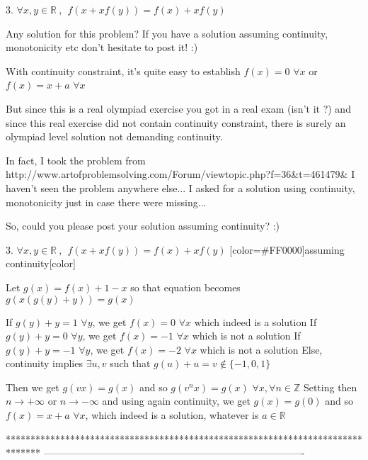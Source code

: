 \begin{solution}
	\begin{tcolorbox}3. $\forall x, y \in \mathbb{R} \ , \  \  f(x+xf(y))=f(x)+xf(y)$\end{tcolorbox}
\begin{tcolorbox}Any solution for this problem? If you have a solution assuming continuity, monotonicity etc don't hesitate to post it! :) \end{tcolorbox}
With continuity constraint, it's quite easy to establish $f(x)=0$ $\forall x$ or $f(x)=x+a$ $\forall x$

But since this is a real olympiad exercise you got in a real exam (isn't it ?) and since this real exercise did not contain continuity constraint, there is surely an olympiad level solution not demanding continuity.
\end{solution}



\begin{solution}
	In fact, I took the problem from http://www.artofproblemsolving.com/Forum/viewtopic.php?f=36&t=461479& 
I haven't seen the problem anywhere else... I asked for a solution using continuity, monotonicity just in case there were missing...

So, could you please post your solution assuming continuity? :)
\end{solution}



\begin{solution}
	\begin{tcolorbox}3. $\forall x, y \in \mathbb{R} \ , \  \  f(x+xf(y))=f(x)+xf(y)$
[color=#FF0000]assuming continuity[\/color]

\end{tcolorbox}
Let $g(x)=f(x)+1-x$ so that equation becomes $g(x(g(y)+y))=g(x)$

If $g(y)+y=1$ $\forall y$, we get $\boxed{f(x)=0}$ $\forall x$ which indeed is a solution
If $g(y)+y=0$ $\forall y$, we get $f(x)=-1$ $\forall x$ which is not a solution
If $g(y)+y=-1$ $\forall y$, we get $f(x)=-2$ $\forall x$ which is not a solution
Else, continuity implies $\exists u,v$ such that $g(u)+u=v\notin\{-1,0,1\}$

Then we get $g(vx)=g(x)$ and so $g(v^nx)=g(x)$ $\forall x,\forall n\in\mathbb Z$
Setting then $n\to+\infty$ or $n\to-\infty$ and using again continuity, we get $g(x)=g(0)$ and so $\boxed{f(x)=x+a}$ $\forall x$, which indeed is a solution, whatever is $a\in\mathbb R$
\end{solution}
*******************************************************************************
-------------------------------------------------------------------------------

